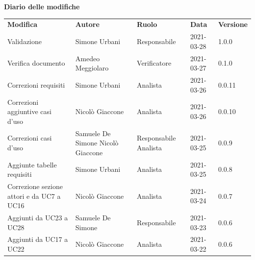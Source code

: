 \documentclass[a4paper]{article}
\begin{document}
\begin{center}
    \textbf{\Large Diario delle modifiche}\\
    \vspace{10px}
    \begin{table}[h!]
        \centering
        \renewcommand{\arraystretch}{1.8}
        \begin{tabular}{p{160px} p{90px} p{60px} p{60px} p{50px}}
            \rowcolor{logo!70} \textbf{Modifica}                 & \textbf{Autore}                            & \textbf{Ruolo}                 & \textbf{Data} & \textbf{Versione} \\
            Validazione                                          & Simone Urbani                              & Responsabile                   & 2021-03-28    & 1.0.0             \\
            Verifica documento                                   & Amedeo Meggiolaro                          & Verificatore                   & 2021-03-27    & 0.1.0             \\
            Correzioni requisiti                                 & Simone Urbani                              & Analista                       & 2021-03-26    & 0.0.11            \\
            Correzioni aggiuntive casi d'uso                     & Nicolò Giaccone                            & Analista                       & 2021-03-26    & 0.0.10            \\
            Correzioni casi d'uso                                & Samuele De Simone \newline Nicolò Giaccone & Responsabile \newline Analista & 2021-03-25    & 0.0.9             \\
            Aggiunte tabelle requisiti                           & Simone Urbani                              & Analista                       & 2021-03-25    & 0.0.8             \\
            Correzione sezione attori e da UC7 a UC16            & Nicolò Giaccone                            & Analista                       & 2021-03-24    & 0.0.7             \\
            Aggiunti da UC23 a UC28                              & Samuele De Simone                          & Responsabile                   & 2021-03-23    & 0.0.6             \\
            Aggiunti da UC17 a UC22                              & Nicolò Giaccone                            & Analista                       & 2021-03-22    & 0.0.6             \\

\end{tabular}
\end{table}
\end{center}
\end{document}
